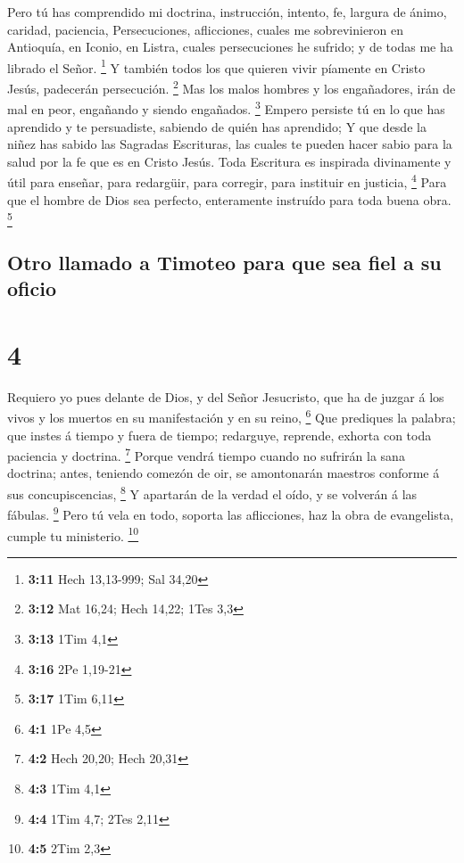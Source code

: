 Pero tú has comprendido mi doctrina, instrucción, intento,
fe, largura de ánimo, caridad, paciencia,  Persecuciones,
aflicciones, cuales me sobrevinieron en Antioquía, en Iconio, en Listra,
cuales persecuciones he sufrido; y de todas me ha librado el Señor.
\footnote{\textbf{3:11} Hech 13,13-999; Sal 34,20}  Y
también todos los que quieren vivir píamente en Cristo Jesús, padecerán
persecución. \footnote{\textbf{3:12} Mat 16,24; Hech 14,22; 1Tes 3,3}
 Mas los malos hombres y los engañadores, irán de mal en
peor, engañando y siendo engañados. \footnote{\textbf{3:13} 1Tim 4,1}
 Empero persiste tú en lo que has aprendido y te
persuadiste, sabiendo de quién has aprendido;  Y que desde
la niñez has sabido las Sagradas Escrituras, las cuales te pueden hacer
sabio para la salud por la fe que es en Cristo Jesús.  Toda
Escritura es inspirada divinamente y útil para enseñar, para redargüir,
para corregir, para instituir en justicia, \footnote{\textbf{3:16} 2Pe
  1,19-21}  Para que el hombre de Dios sea perfecto,
enteramente instruído para toda buena obra. \footnote{\textbf{3:17} 1Tim
  6,11}

\hypertarget{otro-llamado-a-timoteo-para-que-sea-fiel-a-su-oficio}{%
\subsection{Otro llamado a Timoteo para que sea fiel a su
oficio}\label{otro-llamado-a-timoteo-para-que-sea-fiel-a-su-oficio}}

\hypertarget{section-3}{%
\section{4}\label{section-3}}

 Requiero yo pues delante de Dios, y del Señor Jesucristo,
que ha de juzgar á los vivos y los muertos en su manifestación y en su
reino, \footnote{\textbf{4:1} 1Pe 4,5}  Que prediques la
palabra; que instes á tiempo y fuera de tiempo; redarguye, reprende,
exhorta con toda paciencia y doctrina. \footnote{\textbf{4:2} Hech
  20,20; Hech 20,31}  Porque vendrá tiempo cuando no
sufrirán la sana doctrina; antes, teniendo comezón de oir, se
amontonarán maestros conforme á sus concupiscencias, \footnote{\textbf{4:3}
  1Tim 4,1}  Y apartarán de la verdad el oído, y se volverán
á las fábulas. \footnote{\textbf{4:4} 1Tim 4,7; 2Tes 2,11} 
Pero tú vela en todo, soporta las aflicciones, haz la obra de
evangelista, cumple tu ministerio. \footnote{\textbf{4:5} 2Tim 2,3}

